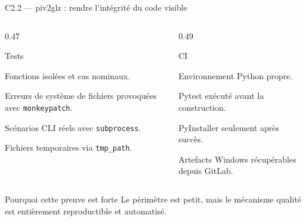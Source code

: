 \begin{frame}{C2.2 — piv2glz : rendre l'intégrité du code visible}
\begin{columns}[T]
\begin{column}{0.47\linewidth}
\begin{block}{Tests}
\begin{tightitems}
  \item Fonctions isolées et cas nominaux.
  \item Erreurs de système de fichiers provoquées avec \texttt{monkeypatch}.
  \item Scénarios CLI réels avec \texttt{subprocess}.
  \item Fichiers temporaires via \texttt{tmp\_path}.
\end{tightitems}
\end{block}
\end{column}
\begin{column}{0.49\linewidth}
\begin{block}{CI}
\begin{tightitems}
  \item Environnement Python propre.
  \item Pytest exécuté avant la construction.
  \item PyInstaller seulement après succès.
  \item Artefacts Windows récupérables depuis GitLab.
\end{tightitems}
\end{block}
\end{column}
\end{columns}
\begin{block}{Pourquoi cette preuve est forte}
Le périmètre est petit, mais le mécanisme qualité est entièrement reproductible et automatisé.
\end{block}
\end{frame}

